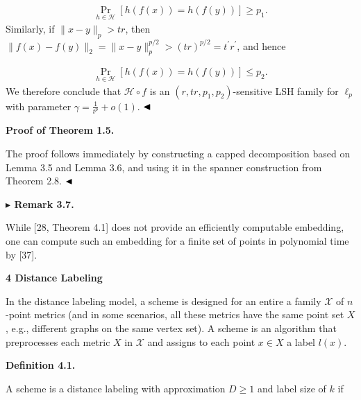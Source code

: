 \[\begin{aligned}
\Pr_{h\in\mathcal{H}}[h(f(x))=h(f(y))]\geq p_{1}.
\end{aligned}\]
Similarly, if $\|x-y\|_{p}>tr$, then $\|f(x)-f(y)\|_{2}=\|x-y\|_{p}^{p/2}>(tr)^{p/2}=t^{\prime}r^{\prime}$, and hence
\par
\[\begin{aligned}
\Pr_{h\in\mathcal{H}}[h(f(x))=h(f(y))]\leq p_{2}.
\end{aligned}\]
We therefore conclude that $\mathcal{H}\circ f$ is an $(r,tr,p_{1},p_{2})$-sensitive LSH family for $\ell_{p}$ with parameter $\gamma=\frac{1}{t^{p}}+o(1)$. $\hfill\blacktriangleleft$
\par
\par
\par
\par\medskip\noindent\textbf{Proof of Theorem 1.5.}\par
The proof follows immediately by constructing a capped decomposition based on Lemma 3.5 and Lemma 3.6, and using it in the spanner construction from Theorem 2.8. $\hfill\blacktriangleleft$
\par
\par
\par\medskip\noindent\textbf{$\blacktriangleright$ Remark 3.7.}\par
While [28, Theorem 4.1] does not provide an efficiently computable embedding, one can compute such an embedding for a finite set of points in polynomial time by [37].
\par
\par
\par
\par
\par
\par\medskip\noindent\textbf{4 Distance Labeling}\par
In the distance labeling model, a scheme is designed for an entire a family $\mathcal{X}$ of $n$-point metrics (and in some scenarios, all these metrics have the same point set $X$, e.g., different graphs on the same vertex set). A scheme is an algorithm that preprocesses each metric $X$ in $\mathcal{X}$ and assigns to each point $x\in X$ a label $l(x)$.
\par
\par
\par\medskip\noindent\textbf{Definition 4.1.}\par
A scheme is a distance labeling with approximation $D\geq 1$ and label size of $k$ if
